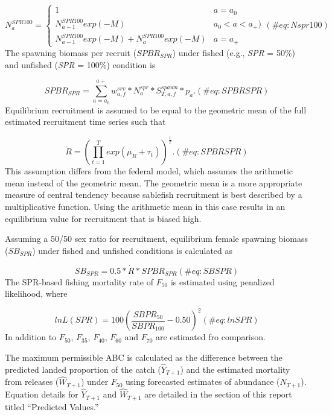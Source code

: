 \documentclass[
]{article}
\begin{document}
\[
\begin{equation}
N_{a}^{SPR100} = \left\{ \begin{array}{lll}
1 &a = a_{0}\\
N_{a-1}^{SPR100}exp(-M) &a_{0} < a < a_{+})\\
N_{a-1}^{SPR100}exp(-M) +  N_{a}^{SPR100}exp(-M) &a=a_{+}
\end{array}\right.
(\#eq:Nspr100)
\end{equation}
\] The spawning biomass per recruit (\({SPBR}_{SPR}\)) under fished
(e.g., \emph{SPR} = 50\%) and unfished (\emph{SPR} = 100\%) condition is

\[
\begin{equation}
SPBR_{SPR}={\sum_{a=a_0}^{a+}}w_{a,f}^{srv}*N_a^{spr}*S_{T,a,f}^{spawn}*p_a.
(\#eq:SPBRSPR)
\end{equation}
\] Equilibrium recruitment is assumed to be equal to the geometric mean
of the full estimated recruitment time series such that

\[
\begin{equation}
\dot{R}=({\prod_{t=1}^{T}exp(\mu_R+\tau_t)})^{\frac{1}{T}}.
(\#eq:SPBRSPR)
\end{equation}
\] This assumption differs from the federal model, which assumes the
arithmetic mean instead of the geometric mean. The geometric mean is a
more appropriate measure of central tendency because sablefish
recruitment is best described by a multiplicative function. Using the
arithmetic mean in this case results in an equilibrium value for
recruitment that is biased high.

Assuming a 50/50 sex ratio for recruitment, equilibrium female spawning
biomass (\({SB}_{SPR}\)) under fished and unfished conditions is
calculated as

\[
\begin{equation}
SB_{SPR}=0.5*\dot{R}*SPBR_{SPR}
(\#eq:SBSPR)
\end{equation}
\] The SPR-based fishing mortality rate of \(F_{50}\) is estimated using
penalized likelihood, where

\[
\begin{equation}
lnL(SPR) = 100({\frac{SBPR_{50}}{SBPR_{100}}-0.50})^2
(\#eq:lnSPR)
\end{equation}
\] In addition to \(F_{50}\), \(F_{35}\), \(F_{40}\), \(F_{60}\) and
\(F_{70}\) are estimated fro comparison.

The maximum permissible ABC is calculated as the difference between the
predicted landed proportion of the catch (\(\hat{Y}_{T+1}\)) and the
estimated mortality from releases (\(\hat{W}_{T+1}\)) under \(F_{50}\)
using forecasted estimates of abundance (\(N_{T+1}\)). Equation details
for \(\hat{Y}_{T+1}\) and \(\hat{W}_{T+1}\) are detailed in the section
of this report titled ``Predicted Values.''
\end{document}
